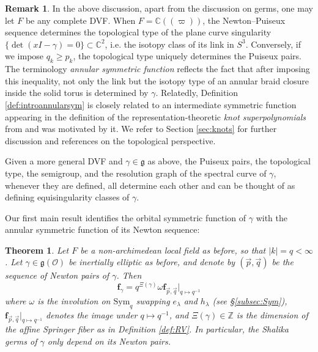 \documentclass{amsart}
\numberwithin{equation}{section}
\newtheorem{theorem}[lemma]{Theorem}%
\theoremstyle{definition}
\newtheorem{remark}[lemma]{Remark}%
\def\Sym{{\mathrm{Sym}}}
\newcommand{\frs}{\mathbf{f}_{\vec{p},\vec{q}}}
\newcommand{\fgamma}{\mathbf{f}_{\gamma}}
\newcommand{\cO}{\mathcal{O}}
\newcommand{\fg}{\mathfrak{g}}
\newcommand{\C}{{\mathbb C}}
\newcommand{\Z}{{\mathbb Z}}
\begin{document}
\begin{remark}
\label{rmk:puiseux}
In the above discussion, apart from the discussion on germs, one may let $F$ be any complete DVF. When $F=\C((\varpi))$, the Newton--Puiseux sequence 
determines the topological type of the plane curve singularity $\{\det(xI-\gamma)=0\}\subset \C^2$, i.e. the isotopy class of its link in $S^3$. Conversely, if we impose $q_k\geq p_k$, the topological type uniquely determines the Puiseux pairs. The terminology {\em annular symmetric function} reflects the fact that after imposing this inequality, not only the link but the isotopy type of an annular braid closure inside the solid torus is determined by $\gamma$. Relatedly, Definition \ref{def:introannularsym} is closely related to an intermediate symmetric function appearing in the definition of the representation-theoretic {\em knot superpolynomials} from \cite{CD,MS} and was motivated by it.
We refer to Section \ref{sec:knots} for further discussion and references on the topological perspective.

Given a more general DVF and $\gamma\in\fg$ as above, the Puiseux pairs, the topological type, the semigroup, and the resolution graph of the spectral curve of $\gamma$, whenever they are defined, all determine each other and can be thought of as defining equisingularity classes of $\gamma$.
\end{remark}
Our first main result identifies the orbital symmetric function of $\gamma$ with the annular symmetric function of its Newton sequence:
\begin{theorem}
\label{thm:mastersymfn}
Let $F$ be a non-archimedean local field as before, so that $|k|=q<\infty$. Let $\gamma\in\fg(\cO)$ be inertially elliptic as before, and denote by $(\vec{p},\vec{q})$ be the sequence of Newton pairs of $\gamma$.
Then
\begin{equation}
\label{eq:totram}
\fgamma=q^{\Xi(\gamma)}\omega\frs|_{q\mapsto q^{-1}}
\end{equation}
where $\omega$ is the involution on $\Sym_{q}$ swapping $e_{\lambda}$ and $h_{\lambda}$ (see \S\ref{subsec:Sym}), $\frs|_{q\mapsto q^{-1}}$ denotes the image under $q\mapsto q^{-1}$, and $\Xi(\gamma)\in\Z$ is the dimension of the affine Springer fiber as in Definition \ref{def:RV}. In particular, the Shalika germs of $\gamma$ only depend on its Newton pairs. 
\end{theorem}
\end{document}
